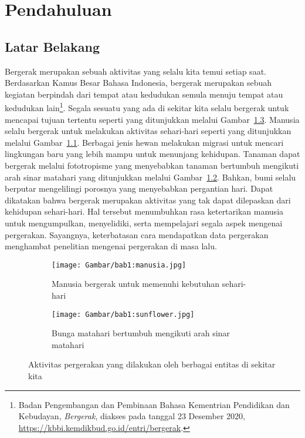 \chapter{Pendahuluan}
\label{chap:intro}
   
\section{Latar Belakang}
\label{sec:label}

Bergerak merupakan sebuah aktivitas yang selalu kita temui setiap saat. Berdasarkan Kamus Besar Bahasa Indonesia, bergerak merupakan sebuah kegiatan berpindah dari tempat atau kedudukan semula menuju tempat atau kedudukan lain\footnote{Badan Pengembangan dan Pembinaan Bahasa Kementrian Pendidikan dan Kebudayan, \textit{Bergerak}, diakses pada tanggal 23 Desember 2020, \url{https://kbbi.kemdikbud.go.id/entri/bergerak}.}. Segala sesuatu yang ada di sekitar kita selalu bergerak untuk mencapai tujuan tertentu seperti yang ditunjukkan melalui Gambar~\ref{bab1:pergerakan}. Manusia selalu bergerak untuk melakukan aktivitas sehari-hari seperti yang ditunjukkan melalui Gambar~\ref{bab1:manusia}. Berbagai jenis hewan melakukan migrasi untuk mencari lingkungan baru yang lebih mampu untuk menunjang kehidupan. Tanaman dapat bergerak melalui fototropisme yang menyebabkan tanaman bertumbuh mengikuti arah sinar matahari yang ditunjukkan melalui Gambar~\ref{bab1:sunflower}. Bahkan, bumi selalu berputar mengelilingi porosnya yang menyebabkan pergantian hari. Dapat dikatakan bahwa bergerak merupakan aktivitas yang tak dapat dilepaskan dari kehidupan sehari-hari. Hal tersebut menumbuhkan rasa ketertarikan manusia untuk mengumpulkan, menyelidiki, serta mempelajari segala aspek mengenai pergerakan. Sayangnya, keterbatasan cara mendapatkan data pergerakan menghambat penelitian mengenai pergerakan di masa lalu.

\begin{figure}[h]
    \centering
    \begin{subfigure}[b]{0.45\textwidth}
        \texttt{[image: Gambar/bab1:manusia.jpg]}
        \caption{Manusia bergerak untuk memenuhi kebutuhan sehari-hari\protect\footnotemark[2]}
        \label{bab1:manusia}
    \end{subfigure} \hspace{0.25cm}
    \begin{subfigure}[b]{0.45\textwidth}
        \texttt{[image: Gambar/bab1:sunflower.jpg]}
        \caption{Bunga matahari bertumbuh mengikuti arah sinar matahari\protect\footnotemark[3]}
        \label{bab1:sunflower}
    \end{subfigure}
    \caption[Aktivitas pergerakan]{
    Aktivitas pergerakan yang dilakukan oleh berbagai entitas di sekitar kita}
    \label{bab1:pergerakan}
\end{figure}

